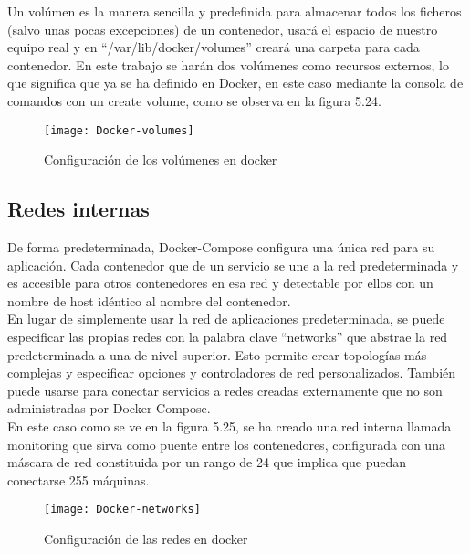 \documentclass[ spanish, a4paper, 12pt, oneside]{report}
\begin{document}
Un volúmen es la manera sencilla y predefinida para almacenar todos los ficheros (salvo unas pocas excepciones) de un contenedor, usará el espacio de nuestro equipo real y en ``/var/lib/docker/volumes'' creará una carpeta para cada contenedor. En este trabajo se harán dos volúmenes como recursos externos, 
lo que significa que ya se ha definido en Docker, en este caso mediante la consola de comandos con un create volume, como se observa en la figura 5.24.\\

\begin{figure}[!h]
   \centering
   \texttt{[image: Docker-volumes]}\\
      \caption{\label{fig: Configuración de los volúmenes en docker} Configuración de los volúmenes en docker}
\end{figure}

\subsection{Redes internas}
De forma predeterminada, Docker-Compose configura una única red para su aplicación. Cada contenedor que de un servicio se une a la red predeterminada y es accesible para otros contenedores en esa red y detectable por ellos con un nombre de host idéntico al nombre del contenedor.\\

En lugar de simplemente usar la red de aplicaciones predeterminada, se puede especificar las propias redes con la palabra clave ``networks'' que abstrae la red predeterminada a una de nivel superior. Esto permite crear topologías más complejas y especificar opciones y controladores de red personalizados. 
También puede usarse para conectar servicios a redes creadas externamente que no son administradas por Docker-Compose. \\

En este caso como se ve en la figura 5.25, se ha creado una red interna llamada monitoring que sirva como puente entre los contenedores, configurada con una máscara de red constituida por un rango de 24 que implica que puedan conectarse 255 máquinas.\\

\begin{figure}[!h]
   \centering
   \texttt{[image: Docker-networks]}\\
      \caption{\label{fig: Configuración de las redes en docker} Configuración de las redes en docker}
\end{figure}
\end{document}
